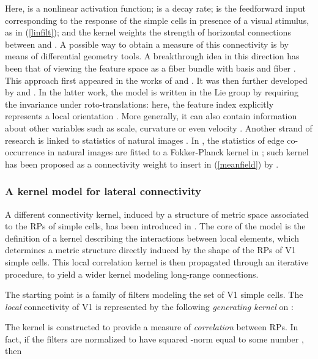 \documentclass[11pt,oneside,reqno]{amsart}
\begin{document}
 Here,  is a nonlinear activation function;  is a decay rate;  is the feedforward input corresponding to the response of the simple cells in presence of a visual stimulus, as in (\ref{linfilt}); and the kernel  weights the strength of horizontal connections between  and . A possible way to obtain a measure of this connectivity is by means of differential geometry tools. A breakthrough idea in this direction has been that of viewing the feature space  as a fiber bundle with basis  and fiber . This approach first appeared in the works of \citet{koenderink} and \citet{hoffman}. It was then further developed by \citet{petitond} and \citet{cs06}. In the latter work, the model is written in the Lie group  by requiring the invariance under roto-translations: here, the feature index explicitly represents a local orientation . More generally, it can also contain information about other variables such as scale, curvature or even velocity \cite[see e.g.][]{symplectic,abbfav,bccs}. Another strand of research is linked to statistics of natural images \citep[see e.g.][]{augzuck,kruger,sigman,edge-stat}. In \citet{edge-stat}, the statistics of edge co-occurrence in natural images are fitted to a Fokker-Planck kernel in ; such kernel has been proposed as a connectivity weight  to insert in (\ref{meanfield}) by \citet{perceptual}. 
 
 \subsubsection{A kernel model for lateral connectivity}\label{neuroker}
 
 A different connectivity kernel, induced by a structure of metric space associated to the RPs of simple cells, has been introduced in \citet{neuro}. The core of the model is the definition of a kernel describing the interactions between local elements, which determines a metric structure directly induced by the shape of the RPs of V1 simple cells. This local correlation kernel is then propagated through an iterative procedure, to yield a wider kernel modeling long-range connections.
 
 The starting point is a family of filters  modeling the set of V1 simple cells. The \emph{local} connectivity of V1 is represented by the following \emph{generating kernel} on : 
 
 The kernel  is constructed to provide a measure of \emph{correlation} between RPs. In fact, if the filters are normalized to have squared -norm equal to some number , then 
 
\end{document}
